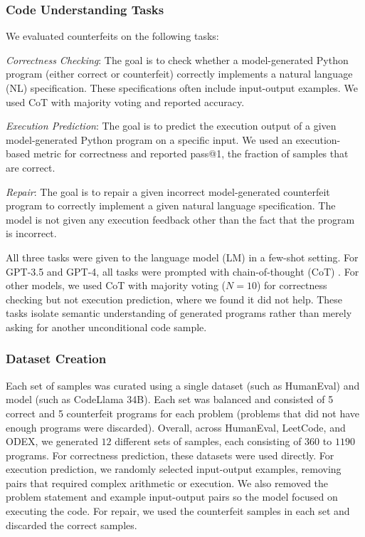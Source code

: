 \subsubsection{Code Understanding Tasks}
We evaluated counterfeits on the following tasks:

\textit{Correctness Checking}: The goal is to check whether a model-generated Python program (either correct or counterfeit) correctly implements a natural language (NL) specification. These specifications often include input-output examples. We used CoT with majority voting \citep{wei2022chain, wang2022self} and reported accuracy.

\textit{Execution Prediction}: The goal is to predict the execution output of a given model-generated Python program on a specific input. We used an execution-based metric for correctness and reported pass@1, the fraction of samples that are correct.

\textit{Repair}: The goal is to repair a given incorrect model-generated counterfeit program to correctly implement a given natural language specification. The model is not given any execution feedback other than the fact that the program is incorrect.

All three tasks were given to the language model (LM) in a few-shot setting. For GPT-3.5 and GPT-4, all tasks were prompted with chain-of-thought (CoT) \citep{wei2022chain}. For other models, we used CoT with majority voting ($N=10$) for correctness checking but not execution prediction, where we found it did not help. These tasks isolate semantic understanding of generated programs rather than merely asking for another unconditional code sample.


\subsubsection{Dataset Creation}
Each set of samples was curated using a single dataset (such as HumanEval) and model (such as CodeLlama 34B). Each set was balanced and consisted of 5 correct and 5 counterfeit programs for each problem (problems that did not have enough programs were discarded). Overall, across HumanEval, LeetCode, and ODEX, we generated $12$ different sets of samples, each consisting of $360$ to $1190$ programs. For correctness prediction, these datasets were used directly. For execution prediction, we randomly selected input-output examples, removing pairs that required complex arithmetic or execution. We also removed the problem statement and example input-output pairs so the model focused on executing the code. For repair, we used the counterfeit samples in each set and discarded the correct samples.
